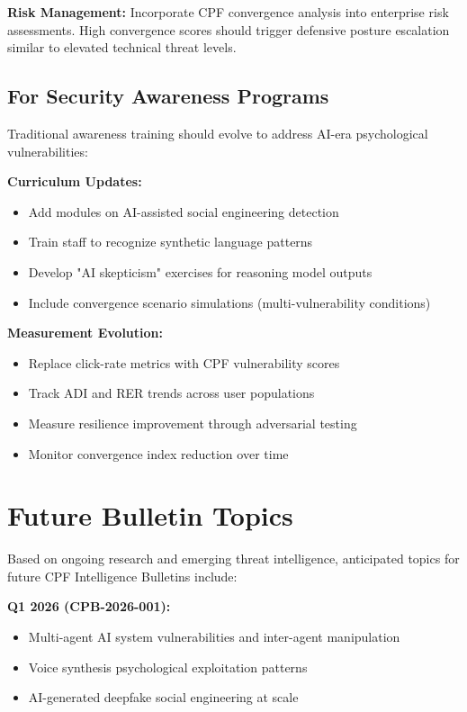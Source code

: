 \documentclass[11pt,a4paper]{article}
\begin{document}
\textbf{Risk Management:} Incorporate CPF convergence analysis into enterprise risk assessments. High convergence scores should trigger defensive posture escalation similar to elevated technical threat levels.

\subsection{For Security Awareness Programs}

Traditional awareness training should evolve to address AI-era psychological vulnerabilities:

\textbf{Curriculum Updates:}
\begin{itemize}
\item Add modules on AI-assisted social engineering detection
\item Train staff to recognize synthetic language patterns
\item Develop "AI skepticism" exercises for reasoning model outputs
\item Include convergence scenario simulations (multi-vulnerability conditions)
\end{itemize}

\textbf{Measurement Evolution:}
\begin{itemize}
\item Replace click-rate metrics with CPF vulnerability scores
\item Track ADI and RER trends across user populations
\item Measure resilience improvement through adversarial testing
\item Monitor convergence index reduction over time
\end{itemize}

\section{Future Bulletin Topics}

Based on ongoing research and emerging threat intelligence, anticipated topics for future CPF Intelligence Bulletins include:

\textbf{Q1 2026 (CPB-2026-001):}
\begin{itemize}
\item Multi-agent AI system vulnerabilities and inter-agent manipulation
\item Voice synthesis psychological exploitation patterns
\item AI-generated deepfake social engineering at scale
\end{itemize}
\end{document}
